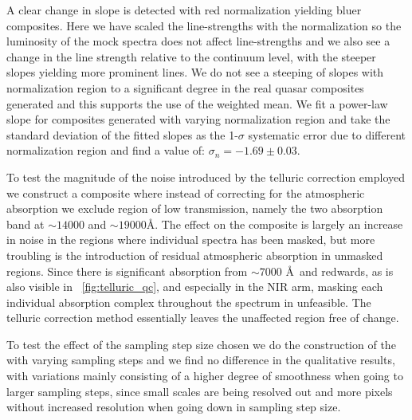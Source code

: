 \documentclass{aa}    %
\newcommand{\figref}[1]{\ref{fig:#1}}
\newcommand{\Fig}[1]{\figurename~\figref{#1}}
\newcommand{\fig}[1]{\Fig{#1}}
\begin{document}
 A clear change in slope is detected with red normalization yielding bluer composites. Here we have scaled the line-strengths with the normalization so the luminosity of the mock spectra does not affect line-strengths and we also see a change in the line strength relative to the continuum level, with the steeper slopes yielding more prominent lines. We do not see a steeping of slopes with normalization region to a significant degree in the real quasar composites generated and this supports the use of the weighted mean. We fit a power-law slope for composites generated with varying normalization region and take the standard deviation of the fitted slopes as the 1-$\sigma$ systematic error due to different normalization region and find a value of: $\sigma_{n} = -1.69 \pm 0.03$.




To test the magnitude of the noise introduced by the telluric correction employed we construct a composite where instead of correcting for the atmospheric absorption we exclude region of low transmission, namely the two absorption band at $\sim 14000$ and $\sim 19000$\AA. The effect on the composite is largely an increase in noise in the regions where individual spectra has been masked, but more troubling is the introduction of residual atmospheric absorption in unmasked regions. Since there is significant absorption from $\sim 7000$ \AA~and redwards, as is also visible in \fig{telluric_qc}, and especially in the NIR arm, masking each individual absorption complex throughout the spectrum in unfeasible. The telluric correction method essentially leaves the unaffected region free of change. 



To test the effect of the sampling step size chosen we do the construction of the with varying sampling steps and we find no difference in the qualitative results, with variations mainly consisting of a higher degree of smoothness when going to larger sampling steps, since small scales are being resolved out and more pixels without increased resolution when going down in sampling step size. 

 
 
\end{document}
